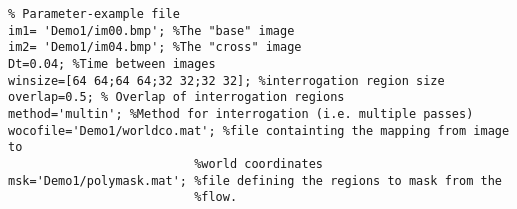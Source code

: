 \documentclass{book}
\newcommand{\matpiv}{{\bf MatPIV~}}
\begin{document}
\begin{verbatim}
% Parameter-example file 
im1= 'Demo1/im00.bmp'; %The "base" image
im2= 'Demo1/im04.bmp'; %The "cross" image
Dt=0.04; %Time between images
winsize=[64 64;64 64;32 32;32 32]; %interrogation region size
overlap=0.5; % Overlap of interrogation regions
method='multin'; %Method for interrogation (i.e. multiple passes)
wocofile='Demo1/worldco.mat'; %file containting the mapping from image to
                          %world coordinates
msk='Demo1/polymask.mat'; %file defining the regions to mask from the
                          %flow.
\end{verbatim}














\end{document}
